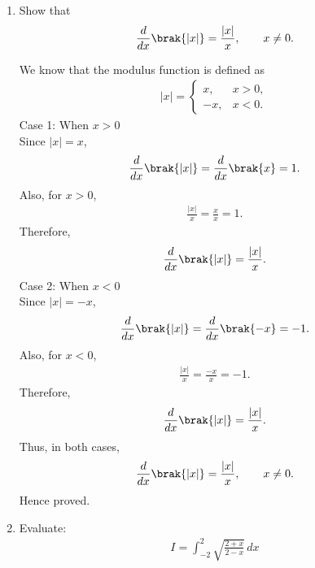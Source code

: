 \begin{enumerate}[label=\thesubsection.\arabic*, ref=\thesubsection.\theenumi]
\item
Show that
\begin{align}
\frac{d}{dx}\brak{|x|}=\frac{|x|}{x},
\qquad x\ne 0.
\end{align}

\solution
We know that the modulus function is defined as
\begin{align}
|x|=
\begin{cases}
x, & x>0,\\
-x, & x<0.
\end{cases}
\end{align}
{Case 1: When $x>0$}
\\Since $|x|=x$,
\begin{align}
\frac{d}{dx}\brak{|x|}
=\frac{d}{dx}\brak{x}=1.
\end{align}
Also, for $x>0$,
\begin{align}
\frac{|x|}{x}=\frac{x}{x}=1.
\end{align}
Therefore,
\begin{align}
\frac{d}{dx}\brak{|x|}=\frac{|x|}{x}.
\end{align}
{Case 2: When $x<0$}
\\Since $|x|=-x$,
\begin{align}
\frac{d}{dx}\brak{|x|}
=\frac{d}{dx}\brak{-x}=-1.
\end{align}
Also, for $x<0$,
\begin{align}
\frac{|x|}{x}=\frac{-x}{x}=-1.
\end{align}
Therefore,
\begin{align}
\frac{d}{dx}\brak{|x|}=\frac{|x|}{x}.
\end{align}
Thus, in both cases,
\begin{align}
\frac{d}{dx}\brak{|x|}=\frac{|x|}{x},
\qquad x\ne 0.
\end{align}
Hence proved.

\item
Evaluate:
\begin{align}
I=\int_{-2}^{2}\sqrt{\frac{2+x}{2-x}}\,dx
\end{align}


\end{enumerate}
